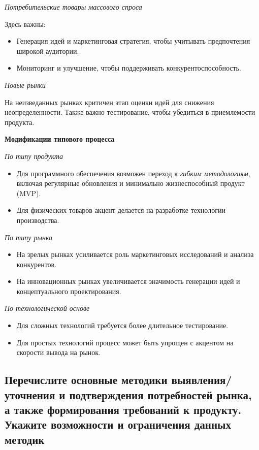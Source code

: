 \textit{Потребительские товары массового спроса}

Здесь важны:
\begin{itemize}
    \item Генерация идей и маркетинговая стратегия, чтобы учитывать предпочтения широкой аудитории.
    \item Мониторинг и улучшение, чтобы поддерживать конкурентоспособность.
\end{itemize}

\textit{Новые рынки}

На неизведанных рынках критичен этап оценки идей для снижения неопределенности. Также важно тестирование, чтобы убедиться в приемлемости продукта.

\textbf{Модификации типового процесса}

\textit{По типу продукта}
\begin{itemize}
    \item Для программного обеспечения возможен переход к \textit{гибким методологиям}, включая регулярные обновления и минимально жизнеспособный продукт (MVP).
    \item Для физических товаров акцент делается на разработке технологии производства.
\end{itemize}

\textit{По типу рынка}
\begin{itemize}
    \item На зрелых рынках усиливается роль маркетинговых исследований и анализа конкурентов.
    \item На инновационных рынках увеличивается значимость генерации идей и концептуального проектирования.
\end{itemize}

\textit{По технологической основе}
\begin{itemize}
    \item Для сложных технологий требуется более длительное тестирование.
    \item Для простых технологий процесс может быть упрощен с акцентом на скорости вывода на рынок.
\end{itemize}


\pagebreak

\subsection{Перечислите основные методики выявления/уточнения и подтверждения потребностей рынка, а также формирования требований к продукту. Укажите возможности и ограничения данных методик}

